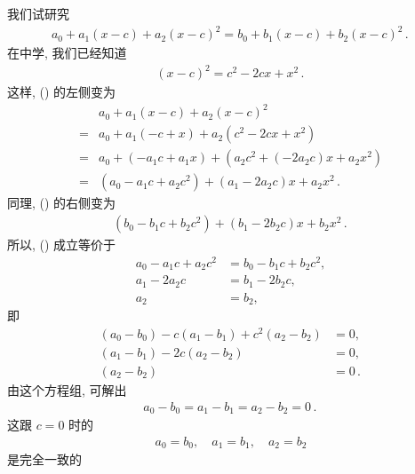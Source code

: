 \begin{example}
    我们试研究
    \begin{align*}
        a_0 + a_1 (x - c) + a_2 (x - c)^2 = b_0 + b_1 (x - c) + b_2 (x - c)^2 \tag*{(\myStar)} \period
    \end{align*}
    在中学, 我们已经知道
    \begin{align*}
        (x - c)^2 = c^2 - 2cx + x^2 \period
    \end{align*}
    这样, (\myStar) 的左侧变为
    \begin{align*}
             & a_0 + a_1 (x - c) + a_2 (x - c)^2                           \\
        = {} & a_0 + a_1 (-c + x) + a_2 (c^2 - 2cx + x^2)                  \\
        = {} & a_0 + (-a_1 c + a_1 x) + (a_2 c^2 + (-2a_2 c) x + a_2 x^2)  \\
        = {} & (a_0 - a_1 c + a_2 c^2) + (a_1 -2a_2 c) x + a_2 x^2 \period
    \end{align*}
    同理, (\myStar) 的右侧变为
    \begin{align*}
        (b_0 - b_1 c + b_2 c^2) + (b_1 -2b_2 c) x + b_2 x^2 \period
    \end{align*}
    所以, (\myStar) 成立等价于
    \begin{align*}
        a_0 - a_1 c + a_2 c^2 & = b_0 - b_1 c + b_2 c^2, \\
        a_1 -2a_2 c           & = b_1 -2b_2 c,           \\
        a_2                   & = b_2,
    \end{align*}
    即
    \begin{align*}
        (a_0 - b_0) - c(a_1 - b_1) + c^2(a_2 - b_2) & = 0,        \\
        (a_1 - b_1) - 2c(a_2 - b_2)                 & = 0,        \\
        (a_2 - b_2)                                 & = 0 \period
    \end{align*}
    由这个方程组, 可解出
    \begin{align*}
        a_0 - b_0 = a_1 - b_1 = a_2 - b_2 = 0 \period
    \end{align*}
    这跟 $c = 0$ 时的
    \begin{align*}
        a_0 = b_0, \quad a_1 = b_1, \quad a_2 = b_2
    \end{align*}
    是完全一致的\period
\end{example}


